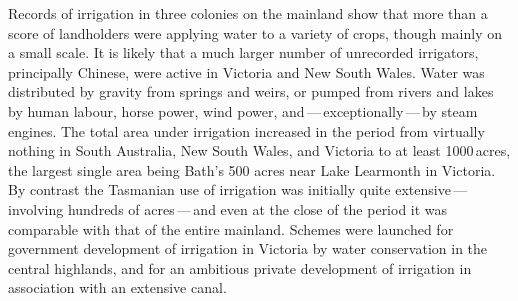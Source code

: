 \closure
Records of irrigation in three colonies on the mainland show that more
than a score of landholders were applying water to a variety of crops,
though mainly on a small scale.  It is likely that a much larger
number of unrecorded irrigators, principally Chinese, were active in
Victoria and New South Wales.  Water was distributed by gravity from
springs and weirs, or pumped from rivers and lakes by human labour,
horse power, wind power, and\,---\,exceptionally\,---\,by steam
engines.  The total area under irrigation increased in the period from
virtually nothing in South Australia, New South Wales, and Victoria to
at least 1000\,acres, the largest single area being Bath's 500 acres
near Lake Learmonth in Victoria.  By contrast the Tasmanian use of
irrigation was initially quite extensive\,---\,involving hundreds of
acres\,---\,and even at the close of the period it was comparable with
that of the entire mainland. Schemes were launched for government
development of irrigation in Victoria by water conservation in the
central highlands, and for an ambitious private development of
irrigation in association with an extensive canal.


